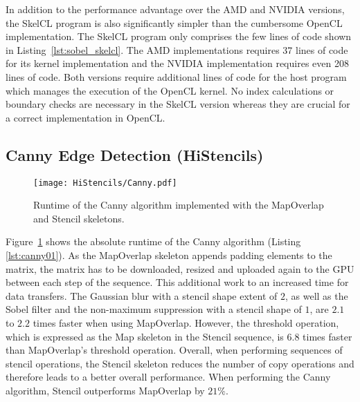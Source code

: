In addition to the performance advantage over the AMD and NVIDIA versions, the SkelCL program is also significantly simpler than the cumbersome OpenCL implementation.
The SkelCL program only comprises the few lines of code shown in Listing~\ref{lst:sobel_skelcl}.
The AMD implementations requires 37 lines of code for its kernel implementation and the NVIDIA implementation requires even 208 lines of code.
Both versions require additional lines of code for the host program which manages the execution of the OpenCL kernel.
No index calculations or boundary checks are necessary in the SkelCL version whereas they are crucial for a correct implementation in OpenCL.


\subsection{Canny Edge Detection (HiStencils)}
\begin{figure}[tbp]
	\centering
	\texttt{[image: HiStencils/Canny.pdf]}
	\caption{Runtime of the Canny algorithm implemented with the MapOverlap and Stencil skeletons.}
	\label{fig:canny}
\end{figure} 

Figure~\ref{fig:canny} shows the absolute runtime of the Canny algorithm (Listing \ref{lst:canny01}). 
As the MapOverlap skeleton appends padding elements to the matrix, the matrix has to be downloaded, resized and uploaded again to the GPU between each step of the sequence.
This additional work to an increased time for data transfers. 
The Gaussian blur with a stencil shape extent of $2$, as well as the Sobel filter and the non-maximum suppression with a stencil shape of $1$, are $2.1$ to $2.2$ times faster when using MapOverlap. 
However, the threshold operation, which is expressed as the Map skeleton in the Stencil sequence, is $6.8$ times faster than MapOverlap's threshold operation.
Overall, when performing sequences of stencil operations, the Stencil skeleton reduces the number of copy operations and therefore leads to a better overall performance.
When performing the Canny algorithm, Stencil outperforms MapOverlap by $21\%$.

